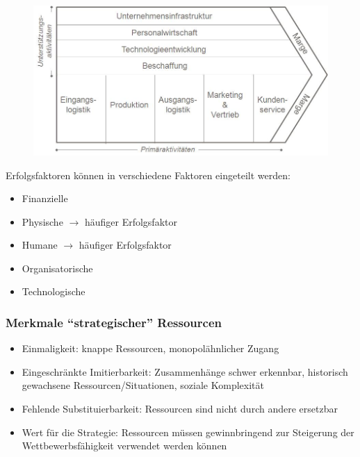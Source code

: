 \documentclass[a4paper,11pt, twoside]{article}
\newcommand\mpar[1]{\marginpar {\flushleft\small #1}}
\begin{document}
\begin{figure}[h]
 \begin{center}
   \includegraphics[scale=0.3]{bilder/Wertkette.jpg}
 \end{center}
\end{figure}

Erfolgsfaktoren können in verschiedene Faktoren eingeteilt werden:
\begin{itemize}
	\item Finanzielle
	\item Physische $\rightarrow$ häufiger Erfolgsfaktor
	\item Humane $\rightarrow$ häufiger Erfolgsfaktor
	\mpar{\textcolor{red}{Monopolstellung bei vorhanden Ressourcen ist immer wertvoll!}}
	\item Organisatorische
	\item Technologische
\end{itemize}
\mpar{\textcolor{red}{Ressourcen die jeder hat, sind nicht wertvoll!}}

\subsubsection*{Merkmale "`strategischer"' Ressourcen}
\begin{itemize}
	\item Einmaligkeit: knappe Ressourcen, monopolähnlicher Zugang  
	\item Eingeschränkte Imitierbarkeit: Zusammenhänge schwer erkennbar, historisch gewachsene Ressourcen/Situationen, soziale Komplexität	
	\item Fehlende Substituierbarkeit: Ressourcen sind nicht durch andere ersetzbar
	\item Wert für die Strategie: Ressourcen müssen gewinnbringend zur Steigerung der Wettbewerbsfähigkeit verwendet werden können
\end{itemize}
\end{document}
